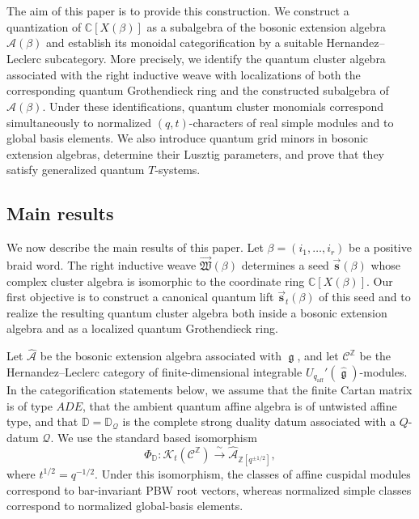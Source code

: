 \documentclass[12pt, reqno]{amsart}
\theoremstyle{plain}
\theoremstyle{definition}
\numberwithin{equation}{section}
\newcommand{\ZZ}{\mathbb{Z}}
\newcommand{\CC}{\mathbb{C}}
\newcommand{\DD}{\mathbb{D}}
\newcommand{\qaff}{q_{\mathrm{aff}}}
\newcommand{\fg}{\operatorname{\mathfrak{g}}}
\newcommand{\cA}{\mathcal{A}}
\begin{document}
The aim of this paper is to provide this construction. We construct a
quantization of \(\CC[X(\beta)]\) as a subalgebra of the bosonic
extension algebra \(\widehat{\cA}(\beta)\) and establish its monoidal
categorification by a suitable Hernandez--Leclerc subcategory. More
precisely, we identify the quantum cluster algebra associated with the
right inductive weave with localizations of both the corresponding
quantum Grothendieck ring and the constructed subalgebra of
\(\widehat{\cA}(\beta)\). Under these identifications, quantum cluster
monomials correspond simultaneously to normalized
\((q,t)\)-characters of real simple modules and to global basis
elements. We also introduce quantum grid minors in bosonic extension
algebras, determine their Lusztig parameters, and prove that they
satisfy generalized quantum \(T\)-systems.





\subsection{Main results}

We now describe the main results of this paper. Let
\(\beta=(i_1,\ldots,i_r)\) be a positive braid word. The right
inductive weave \(\overrightarrow{\mathfrak W}(\beta)\) determines
a seed \(\overrightarrow{\mathbf s}(\beta)\) whose complex cluster algebra
is isomorphic to the coordinate ring \(\CC[X(\beta)]\). Our first
objective is to construct a canonical quantum lift
\(\overrightarrow{\mathbf s}_t(\beta)\) of this seed and to realize
the resulting quantum cluster algebra both inside a bosonic
extension algebra and as a localized quantum Grothendieck ring.

Let \(\widehat{\cA}\) be the bosonic extension algebra associated
with \(\fg\), and let \(\mathscr C^{\ZZ}\) be the
Hernandez--Leclerc category of finite-dimensional integrable
\(U_{\qaff}'(\widehat{\fg})\)-modules. In the categorification statements
below, we assume that the finite Cartan matrix is of type \(ADE\),
that the ambient quantum affine algebra is of untwisted affine type,
and that \(\DD=\DD_{\mathcal Q}\) is the complete strong duality datum
associated with a \(Q\)-datum \(\mathcal Q\). We use the standard based
isomorphism
\begin{equation*}
 \Phi_{\DD}\colon
 \mathcal K_t(\mathscr C^{\ZZ})
 \xrightarrow{\ \sim\ }
 \widehat{\cA}_{\ZZ[q^{\pm1/2}]},
\end{equation*}
where
\(t^{1/2}=q^{-1/2}\). Under this isomorphism, the classes of affine
cuspidal modules correspond to bar-invariant PBW root vectors,
whereas normalized simple classes correspond to normalized
global-basis elements.
\end{document}
